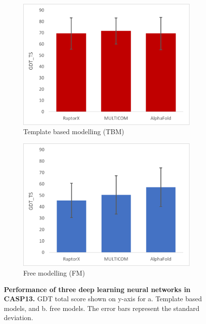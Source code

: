 \begin{figure}[H]
    \centering
    \begin{subfigure}{0.5\textwidth}
        \includegraphics[width=0.8\linewidth]{images/CASP_TBM.png}
        \caption{Template based modelling (TBM)}
        \label{fig:CASP13_TBM}
    \end{subfigure}%
    \begin{subfigure}{0.5\textwidth}
        \includegraphics[width=0.8\linewidth]{images/CASP_FM.png}
        \caption{Free modelling (FM)}
        \label{fig:CASP13_FM}
    \end{subfigure}
    \caption{\textbf{Performance of three deep learning neural networks in CASP13.} GDT total score shown on y-axis for a. Template based models, and b. free models. The error bars represent the standard deviation.}
    \label{fig:CASP13}
\end{figure}

